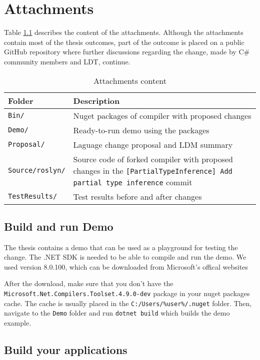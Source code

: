 \chapter{Attachments}

Table \ref{img80:attachment} describes the content of the attachments. 
Although the attachments contain most of the thesis outcomes, part of the outcome is placed on a public GitHub repository where further discussions regarding the change, made by C\# community members and LDT, continue.
\begin{table}[h]
\centering
\begin{tabular}{ | m{11em} | m{22em}| } 
\hline
\textbf{Folder} & \textbf{Description} \\
\hline
\texttt{Bin/} & Nuget packages of compiler with proposed changes \\
\hline
\texttt{Demo/} & Ready-to-run demo using the packages \\
\hline
\texttt{Proposal/} & Laguage change proposal and LDM summary \\
\hline
\texttt{Source/roslyn/} & Source code of forked compiler with proposed changes in the \texttt{[PartialTypeInference] Add partial type inference} commit \\
\hline
\texttt{TestResults/} & Test results before and after changes \\
\hline
\end{tabular}
\caption{Attachments content}
\label{img80:attachment}
\end{table}

\section{Build and run Demo}

The thesis contains a demo that can be used as a playground for testing the change. 
The .NET SDK is needed to be able to compile and run the demo. We used version 8.0.100, which can be downloaded from Microsoft's offical websites
\par
After the download, make sure that you don't have the\\ \texttt{Microsoft.Net.Compilers.Toolset.4.9.0-dev} package in your nuget packages cache.
The cache is usually placed in the \texttt{C:/Users/\%user\%/.nuget} folder.
Then, navigate to the \texttt{Demo} folder and run \texttt{dotnet build} which builds the demo example.

\section{Build your applications}

